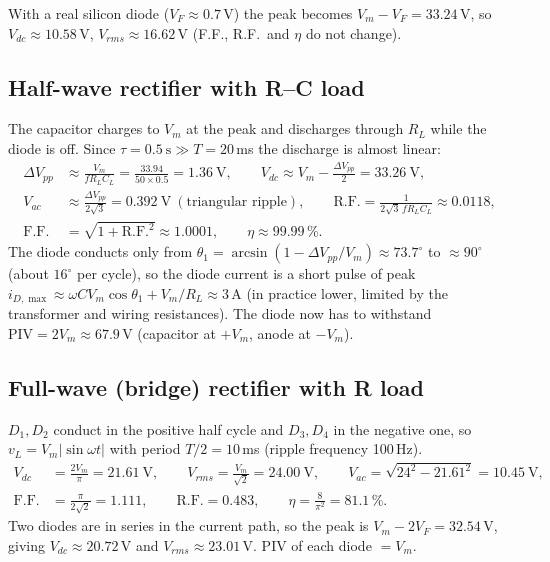 \documentclass[11pt,a4paper]{article}
\begin{document}
With a real silicon diode ($V_F\approx0.7$\,V) the peak becomes $V_m-V_F=33.24$\,V, so
$V_{dc}\approx 10.58$\,V, $V_{rms}\approx16.62$\,V (F.F., R.F.\ and $\eta$ do not change).

\subsection{Half-wave rectifier with R--C load}
The capacitor charges to $V_m$ at the peak and discharges through $R_L$ while the
diode is off. Since $\tau=0.5\ \text{s}\gg T=20$\,ms the discharge is almost linear:
\begin{align*}
\Delta V_{pp}&\approx\frac{V_m}{fR_LC_L}=\frac{33.94}{50\times0.5}=1.36\ \text{V},\qquad
V_{dc}\approx V_m-\frac{\Delta V_{pp}}{2}=33.26\ \text{V},\\
V_{ac}&\approx\frac{\Delta V_{pp}}{2\sqrt3}=0.392\ \text{V}\ (\text{triangular ripple}),\qquad
\text{R.F.}=\frac{1}{2\sqrt3\,fR_LC_L}\approx 0.0118,\\
\text{F.F.}&=\sqrt{1+\text{R.F.}^2}\approx1.0001,\qquad \eta\approx 99.99\,\%.
\end{align*}
The diode conducts only from $\theta_1=\arcsin(1-\Delta V_{pp}/V_m)\approx73.7^\circ$
to $\approx90^\circ$ (about $16^\circ$ per cycle), so the diode current is a short pulse of
peak $i_{D,\max}\approx\omega C V_m\cos\theta_1+V_m/R_L\approx3$\,A (in practice lower,
limited by the transformer and wiring resistances).
The diode now has to withstand $\text{PIV}=2V_m\approx 67.9$\,V
(capacitor at $+V_m$, anode at $-V_m$).

\subsection{Full-wave (bridge) rectifier with R load}
$D_1,D_2$ conduct in the positive half cycle and $D_3,D_4$ in the negative one, so
$v_L=V_m|\sin\omega t|$ with period $T/2=10$\,ms (ripple frequency 100\,Hz).
\begin{align*}
V_{dc}&=\frac{2V_m}{\pi}=21.61\ \text{V},\qquad V_{rms}=\frac{V_m}{\sqrt2}=24.00\ \text{V},\qquad
V_{ac}=\sqrt{24^2-21.61^2}=10.45\ \text{V},\\
\text{F.F.}&=\frac{\pi}{2\sqrt2}=1.111,\qquad \text{R.F.}=0.483,\qquad
\eta=\frac{8}{\pi^2}=81.1\,\%.
\end{align*}
Two diodes are in series in the current path, so the peak is $V_m-2V_F=32.54$\,V,
giving $V_{dc}\approx20.72$\,V and $V_{rms}\approx23.01$\,V. PIV of each diode $=V_m$.
\end{document}
